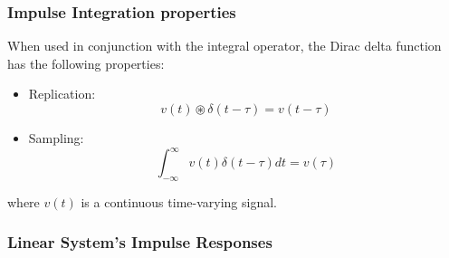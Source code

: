 \subsubsection{Impulse Integration properties}

When used in conjunction with the integral operator, the Dirac delta function
has the following properties:

\begin{itemize}
    \item Replication:
        \begin{equation}
             v(t) \circledast \delta (t- \tau) = v(t - \tau)
        \end{equation}
        
    \item Sampling:
        \begin{equation}
            \int_{-\infty}^{\infty} {v(t) \delta (t- \tau)} dt = v(\tau)
        \end{equation}
\end{itemize}

where $v(t)$ is a continuous time-varying signal.

\subsubsection{Linear System's Impulse Responses}